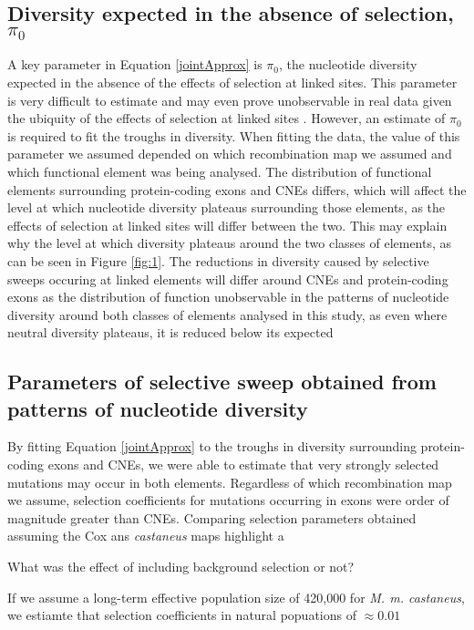 	\subsection*{Diversity expected in the absence of selection, $\pi_0$}

	A key parameter in Equation \ref{jointApprox} is $\pi_0$, the nucleotide diversity expected in the absence of the effects of selection at linked sites. This parameter is very difficult to estimate and may even prove unobservable in real data given the ubiquity of the effects of selection at linked sites \citep{RN357}. However, an estimate of $\pi_0$ is required to fit the troughs in diversity. When fitting the data, the value of this parameter we assumed depended on which recombination map we assumed and which functional element was being analysed. The distribution of functional elements surrounding protein-coding exons and CNEs differs, which will affect the level at which nucleotide diversity plateaus surrounding those elements, as the effects of selection at linked sites will differ between the two. This may explain why the level at which diversity plateaus around the two classes of elements, as can be seen in Figure \ref{fig:1}.
	The reductions in diversity caused by selective sweeps occuring at linked elements will differ around CNEs and protein-coding exons as the distribution of function
	unobservable in the patterns of nucleotide diversity around both classes of elements analysed in this study, as even where neutral diversity plateaus, it is reduced below its expected 

\subsection*{Parameters of selective sweep obtained from patterns of nucleotide diversity}

	By fitting Equation \ref{jointApprox} to the troughs in diversity surrounding protein-coding exons and CNEs, we were able to estimate that very strongly selected mutations may occur in both elements. Regardless of which recombination map we assume, selection coefficients for mutations occurring in exons were order of magnitude greater than CNEs. Comparing selection parameters obtained assuming the Cox ans \textit{castaneus} maps highlight a 

	What was the effect of including background selection or not?
	
	If we assume a long-term effective population size of 420,000 for \textit{M. m. castaneus}, we estiamte that selection coefficients in natural popuations of $\approx 0.01$


